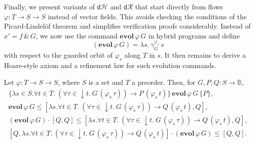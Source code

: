 \documentclass[envcountsame,envcountsect]{llncs}
\newcommand{\dH}{\mathsf{d}\mathcal{H}}
\newcommand{\dR}{\mathsf{d}\mathcal{R}}
\newcommand{\flow}{\varphi}
\newcommand{\bools}{\mathbb{B}}
\begin{document}
Finally, we present variants of $\dH$ and $\dR$ that start directly
from flows $\flow:T\to S\to S$ instead of vector fields.  This avoids
checking the conditions of the Picard-Lindel\"of theorem and
simplifies verification proofs considerably.  Instead of
$x'=f\, \&\, G$, we now use the command
$\mathbf{evol}\, \flow\, G$ in hybrid programs and define
\begin{equation*}
  (\mathbf{evol}\, \flow\, G) = \lambda s.\ \gamma^{\flow_s}_G\, s
\end{equation*}
with respect to the guarded orbit of $\flow_s$ along $T$ in $s$. It
then remains to derive a Hoare-style axiom and a refinement law
for such evolution commands. 
\begin{lemma}\label{P:hr-evlfl}
  Let $\flow:T\to S\to S$, where $S$ is a set and $T$ a
  preorder. Then, for $G,P,Q:S\to \bools$,
\begin{gather*}
\{\lambda s\in S.\forall t\in T.\ (\forall
\tau\in {\downarrow}t.\ G\, (\flow_s\, \tau)) \rightarrow P\,
(\flow_s\, t)\}\, \mathbf{evol}\, \flow\, G\, \{P\}, \label{eq:h-evlfl}\tag{h-evlfl}\\
\mathbf{evol}\, \flow\, G \le [\lambda s.\forall t\in T.\ (\forall
\tau\in {\downarrow}t.\ G\, (\flow_s\, \tau))\to Q\, (\flow_s\, t),Q],\label{eq:r-evlf}\tag{r-evlf}\\
(\mathbf{evol}\, \flow\, G) \cdot \left[Q,Q\right] \le [\lambda s. \forall t\in T.\ (\forall
\tau\in {\downarrow}t.\ G\, (\flow_s\, \tau))\to Q\, (\flow_s\, t),Q],\label{eq:r-evlfl}\tag{r-evlfl}\\
\left[Q,\lambda s. \forall t\in T.\ (\forall
\tau\in {\downarrow}t.\ G\, (\flow_s\, \tau))\to Q\, (\flow_s\, t)\right]\cdot (\mathbf{evol}\, \flow\, G) \le [Q,Q].\label{eq:r-evlfr}\tag{r-evlfr}\\
\end{gather*}
\end{lemma}
\end{document}
